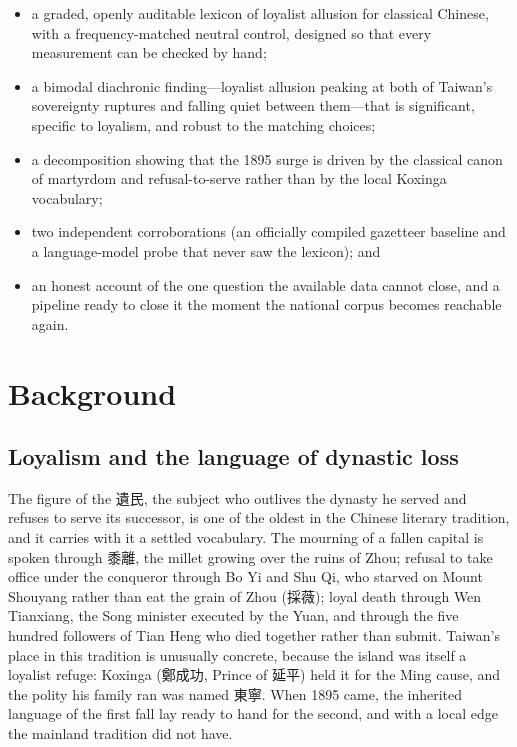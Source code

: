\documentclass[10pt,twocolumn]{article}
\begin{document}
\begin{itemize}\setlength{\itemsep}{2pt}
\item a graded, openly auditable lexicon of loyalist allusion for classical Chinese, with a
frequency-matched neutral control, designed so that every measurement can be checked by hand;
\item a bimodal diachronic finding---loyalist allusion peaking at both of Taiwan's sovereignty
ruptures and falling quiet between them---that is significant, specific to loyalism, and
robust to the matching choices;
\item a decomposition showing that the 1895 surge is driven by the classical canon of
martyrdom and refusal-to-serve rather than by the local Koxinga vocabulary;
\item two independent corroborations (an officially compiled gazetteer baseline and a
language-model probe that never saw the lexicon); and
\item an honest account of the one question the available data cannot close, and a
pipeline ready to close it the moment the national corpus becomes reachable again.
\end{itemize}

\section{Background}
\subsection{Loyalism and the language of dynastic loss}
The figure of the \mbox{遺民}, the subject who outlives the dynasty he served and refuses to
serve its successor, is one of the oldest in the Chinese literary tradition, and it carries
with it a settled vocabulary. The mourning of a fallen capital is spoken through
\mbox{黍離}, the millet growing over the ruins of Zhou; refusal to take office under the
conqueror through Bo Yi and Shu Qi, who starved on Mount Shouyang rather than eat the grain
of Zhou (\mbox{採薇}); loyal death through Wen Tianxiang, the Song minister executed by the
Yuan, and through the five hundred followers of Tian Heng who died together rather than
submit. Taiwan's place in this tradition is unusually concrete, because the island was itself
a loyalist refuge: Koxinga (\mbox{鄭成功}, Prince of \mbox{延平}) held it for the Ming cause,
and the polity his family ran was named \mbox{東寧}. When 1895 came, the inherited language
of the first fall lay ready to hand for the second, and with a local edge the mainland
tradition did not have.
\end{document}
